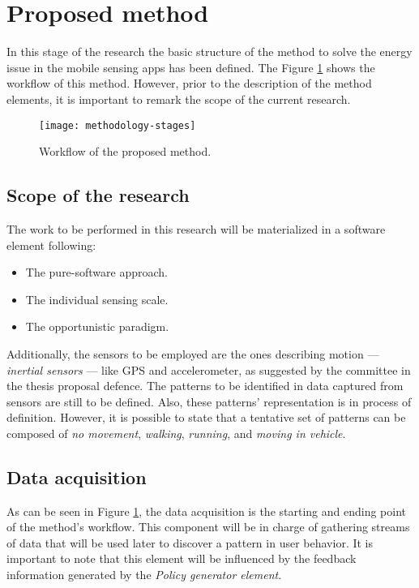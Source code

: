 \section{Proposed method}
\label{sec:proposed_method}

In this stage of the research the basic structure of the method to solve the energy issue in the mobile sensing apps has been defined.
The Figure \ref{fig:methodology-stages} shows the workflow of this method.
However, prior to the description of the method elements, it is important to remark the scope of the current research.

\begin{figure}[h]
\centering
\texttt{[image: methodology-stages]}
\caption[Workflow of the proposed method]{Workflow of the proposed method.}
\label{fig:methodology-stages}
\end{figure}

\subsection{Scope of the research} 
\label{sub:scope_of_the_research}

The work to be performed in this research will be materialized in a software element following:
\begin{itemize}
	\item The pure-software approach.
	\item The individual sensing scale.
	\item The opportunistic paradigm.
\end{itemize}

Additionally, the sensors to be employed are the ones describing motion --- \emph{inertial sensors} --- like GPS and accelerometer, as suggested by the committee in the thesis proposal defence.
The patterns to be identified in data captured from sensors are still to be defined.
Also, these patterns' representation is in process of definition.
However, it is possible to state that a tentative set of patterns can be composed of \emph{no movement}, \emph{walking}, \emph{running}, and \emph{moving in vehicle}.

\subsection{Data acquisition} 
\label{sub:data_acquisition}
As can be seen in Figure \ref{fig:methodology-stages}, the data acquisition is the starting and ending point of the method's workflow.
This component will be in charge of gathering streams of data that will be used later to discover a pattern in user behavior.
It is important to note that this element will be influenced by the feedback information generated by the \emph{Policy generator element}.

